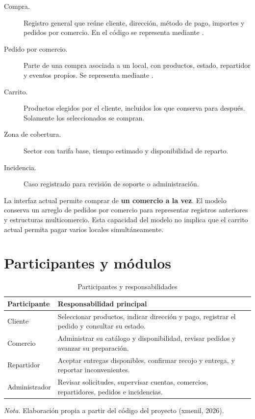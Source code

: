 \documentclass[12pt,letterpaper]{article}
\newcommand{\codigo}[1]{\texttt{\detokenize{#1}}}
\begin{document}
\begin{description}
  \item[Compra.] Registro general que reúne cliente, dirección, método de pago, importes y pedidos por comercio. En el código se representa mediante \codigo{Purchase}.
  \item[Pedido por comercio.] Parte de una compra asociada a un local, con productos, estado, repartidor y eventos propios. Se representa mediante \codigo{MerchantOrder}.
  \item[Carrito.] Productos elegidos por el cliente, incluidos los que conserva para después. Solamente los seleccionados se compran.
  \item[Zona de cobertura.] Sector con tarifa base, tiempo estimado y disponibilidad de reparto.
  \item[Incidencia.] Caso registrado para revisión de soporte o administración.
\end{description}

La interfaz actual permite comprar de \textbf{un comercio a la vez}. El modelo conserva un arreglo de pedidos por comercio para representar registros anteriores y estructuras multicomercio. Esta capacidad del modelo no implica que el carrito actual permita pagar varios locales simultáneamente.

\section{Participantes y módulos}

\begin{table}[htbp]
\caption{Participantes y responsabilidades}
\begin{singlespace}
\begin{tabularx}{\textwidth}{L{2.8cm}X}
\toprule
Participante & Responsabilidad principal \\
\midrule
Cliente & Seleccionar productos, indicar dirección y pago, registrar el pedido y consultar su estado. \\
Comercio & Administrar su catálogo y disponibilidad, revisar pedidos y avanzar su preparación. \\
Repartidor & Aceptar entregas disponibles, confirmar recojo y entrega, y reportar inconvenientes. \\
Administrador & Revisar solicitudes, supervisar cuentas, comercios, repartidores, pedidos e incidencias. \\
\bottomrule
\end{tabularx}
\end{singlespace}
\noindent\textit{Nota.} Elaboración propia a partir del código del proyecto (xmenil, 2026).
\end{table}
\end{document}

